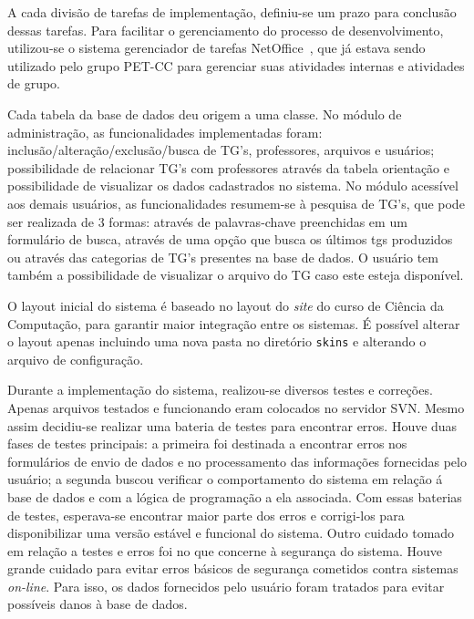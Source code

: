 \documentclass[12pt]{article}
\newcommand{\site}{\textit{site}\xspace}
\begin{document}
A cada divis\~{a}o de tarefas de implementa\c{c}\~{a}o, definiu-se um prazo para conclus\~{a}o dessas tarefas. Para facilitar o gerenciamento do processo de desenvolvimento, utilizou-se o sistema gerenciador de tarefas NetOffice~\cite{netoffice}, que j\'{a} estava sendo utilizado pelo grupo PET-CC para gerenciar suas atividades internas e atividades de grupo.

Cada tabela da base de dados deu origem a uma classe. No m\'{o}dulo de administra\c{c}\~{a}o, as funcionalidades implementadas foram: inclus\~{a}o/altera\c{c}\~{a}o/exclus\~{a}o/busca de TG's, professores, arquivos e usu\'{a}rios; possibilidade de relacionar TG's com professores atrav\'{e}s da tabela orienta\c{c}\~{a}o e possibilidade de visualizar os dados cadastrados no sistema. No m\'{o}dulo acessível aos demais usu\'{a}rios, as funcionalidades resumem-se \`{a} pesquisa de TG's, que pode ser realizada de 3 formas: atrav\'{e}s de palavras-chave preenchidas em um formul\'{a}rio de busca, atrav\'{e}s de uma op\c{c}\~{a}o que busca os \'{u}ltimos tgs produzidos ou atrav\'{e}s das categorias de TG's presentes na base de dados. O usu\'{a}rio tem tamb\'{e}m a possibilidade de visualizar o arquivo do TG caso este esteja dispon\'{i}vel.

O layout inicial do sistema \'{e} baseado no layout do \site do curso de Ci\^{e}ncia da Computa\c{c}\~{a}o, para garantir maior integra\c{c}\~{a}o entre os sistemas. \'{E} poss\'{i}vel  alterar o layout apenas incluindo uma nova pasta no diret\'{o}rio \texttt{skins} e alterando o arquivo de configura\c{c}\~{a}o.

Durante a implementa\c{c}\~{a}o do sistema, realizou-se diversos testes e corre\c{c}\~{o}es. Apenas arquivos testados e funcionando eram colocados no servidor SVN. Mesmo assim decidiu-se realizar uma bateria de testes para encontrar erros. Houve duas fases de testes principais: a primeira foi destinada a encontrar erros nos formul\'{a}rios de envio de dados e no processamento das informa\c{c}\~{o}es fornecidas pelo usu\'{a}rio; a segunda buscou verificar o comportamento do sistema em rela\c{c}\~{a}o \'{a} base de dados e com a l\'{o}gica de programa\c{c}\~{a}o a ela associada. Com essas baterias de testes, esperava-se encontrar maior parte dos erros e corrigi-los para disponibilizar uma vers\~{a}o est\'{a}vel e funcional do sistema. Outro cuidado tomado em rela\c{c}\~{a}o a testes e erros foi no que concerne \`{a} seguran\c{c}a do sistema. Houve grande cuidado para evitar erros b\'{a}sicos de seguran\c{c}a cometidos contra sistemas \emph{on-line}. Para isso, os dados fornecidos pelo usu\'{a}rio foram tratados para evitar poss\'{i}veis danos \`{a} base de dados.
\end{document}
